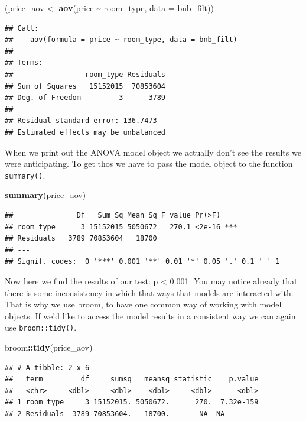 \documentclass[
]{book}
\newenvironment{Shaded}{\begin{snugshade}}{\end{snugshade}}
\newcommand{\DataTypeTok}[1]{\textcolor[rgb]{0.13,0.29,0.53}{#1}}
\newcommand{\KeywordTok}[1]{\textcolor[rgb]{0.13,0.29,0.53}{\textbf{#1}}}
\newcommand{\NormalTok}[1]{#1}
\newcommand{\OperatorTok}[1]{\textcolor[rgb]{0.81,0.36,0.00}{\textbf{#1}}}
\newcommand{\StringTok}[1]{\textcolor[rgb]{0.31,0.60,0.02}{#1}}
\begin{document}
\begin{Shaded}
\begin{Highlighting}[]
\NormalTok{(price\_aov \textless{}{-}}\StringTok{ }\KeywordTok{aov}\NormalTok{(price }\OperatorTok{\textasciitilde{}}\StringTok{ }\NormalTok{room\_type, }\DataTypeTok{data =}\NormalTok{ bnb\_filt))}
\end{Highlighting}
\end{Shaded}

\begin{verbatim}
## Call:
##    aov(formula = price ~ room_type, data = bnb_filt)
## 
## Terms:
##                 room_type Residuals
## Sum of Squares   15152015  70853604
## Deg. of Freedom         3      3789
## 
## Residual standard error: 136.7473
## Estimated effects may be unbalanced
\end{verbatim}

When we print out the ANOVA model object we actually don't see the results we were anticipating. To get thos we have to pass the model object to the function \texttt{summary()}.

\begin{Shaded}
\begin{Highlighting}[]
\KeywordTok{summary}\NormalTok{(price\_aov)}
\end{Highlighting}
\end{Shaded}

\begin{verbatim}
##               Df   Sum Sq Mean Sq F value Pr(>F)    
## room_type      3 15152015 5050672   270.1 <2e-16 ***
## Residuals   3789 70853604   18700                   
## ---
## Signif. codes:  0 '***' 0.001 '**' 0.01 '*' 0.05 '.' 0.1 ' ' 1
\end{verbatim}

Now here we find the results of our test: p \textless{} 0.001. You may notice already that there is some inconsistency in which that ways that models are interacted with. That is why we use broom, to have one common way of working with model objects. If we'd like to access the model results in a consistent way we can again use \texttt{broom::tidy()}.

\begin{Shaded}
\begin{Highlighting}[]
\NormalTok{broom}\OperatorTok{::}\KeywordTok{tidy}\NormalTok{(price\_aov)}
\end{Highlighting}
\end{Shaded}

\begin{verbatim}
## # A tibble: 2 x 6
##   term         df     sumsq   meansq statistic    p.value
##   <chr>     <dbl>     <dbl>    <dbl>     <dbl>      <dbl>
## 1 room_type     3 15152015. 5050672.      270.  7.32e-159
## 2 Residuals  3789 70853604.   18700.       NA  NA
\end{verbatim}
\end{document}
